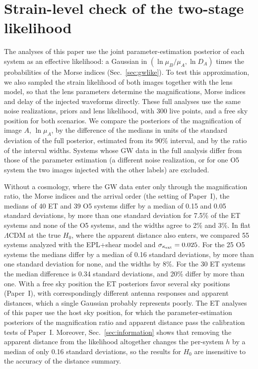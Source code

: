 \section{Strain-level check of the two-stage likelihood}
\label{app:full}
The analyses of this paper use the joint parameter-estimation posterior of each system as an effective likelihood: a Gaussian in $(\ln\mu_B/\mu_A,\ln D_A)$ times the probabilities of the Morse indices (Sec.~\ref{sec:gwlike}). To test this approximation, we also sampled the strain likelihood of both images together with the lens model, so that the lens parameters determine the magnifications, Morse indices and delay of the injected waveforms directly. These full analyses use the same noise realizations, priors and lens likelihood, with 300 live points, and a free sky position for both scenarios. We compare the posteriors of the magnification of image $A$, $\ln\mu_A$, by the difference of the medians in units of the standard deviation of the full posterior, estimated from its 90\% interval, and by the ratio of the interval widths. Systems whose GW data in the full analysis differ from those of the parameter estimation (a different noise realization, or for one O5 system the two images injected with the other labels) are excluded.

Without a cosmology, where the GW data enter only through the magnification ratio, the Morse indices and the arrival order (the setting of Paper~I), the medians of 40 ET and 39 O5 systems differ by a median of 0.15 and 0.05 standard deviations, by more than one standard deviation for 7.5\% of the ET systems and none of the O5 systems, and the widths agree to 2\% and 3\%. In flat $\Lambda$CDM at the true $H_0$, where the apparent distance also enters, we compared 55 systems analyzed with the EPL+shear model and $\sigma_{\kappa_{\rm ext}}=0.025$. For the 25 O5 systems the medians differ by a median of 0.16 standard deviations, by more than one standard deviation for none, and the widths by 8\%. For the 30 ET systems the median difference is 0.34 standard deviations, and 20\% differ by more than one. With a free sky position the ET posteriors favor several sky positions (Paper~I), with correspondingly different antenna responses and apparent distances, which a single Gaussian probably represents poorly. The ET analyses of this paper use the host sky position, for which the parameter-estimation posteriors of the magnification ratio and apparent distance pass the calibration tests of Paper~I. Moreover, Sec.~\ref{sec:information} shows that removing the apparent distance from the likelihood altogether changes the per-system $h$ by a median of only 0.16 standard deviations, so the results for $H_0$ are insensitive to the accuracy of the distance summary.
